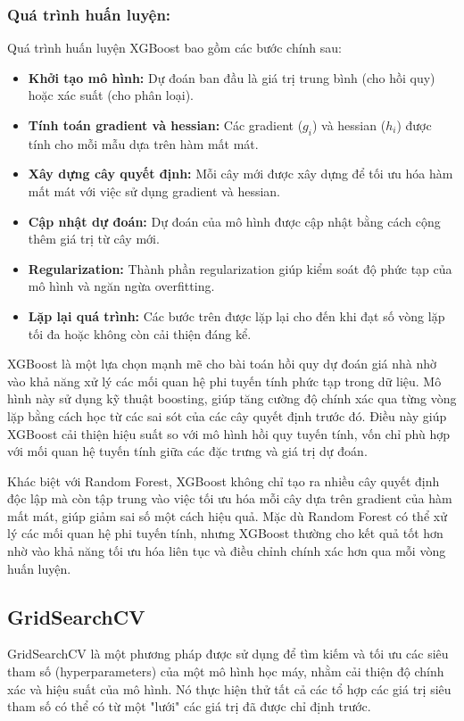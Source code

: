 \subsubsection*{Quá trình huấn luyện:}
Quá trình huấn luyện XGBoost bao gồm các bước chính sau:

\begin{itemize}
    \item[1. ] \textbf{Khởi tạo mô hình:} Dự đoán ban đầu là giá trị trung bình (cho hồi quy) hoặc xác suất (cho phân loại).
    \item[2.] \textbf{Tính toán gradient và hessian:} Các gradient (\( g_i \)) và hessian (\( h_i \)) được tính cho mỗi mẫu dựa trên hàm mất mát.
    \item[3.] \textbf{Xây dựng cây quyết định:} Mỗi cây mới được xây dựng để tối ưu hóa hàm mất mát với việc sử dụng gradient và hessian.
    \item[4.] \textbf{Cập nhật dự đoán:} Dự đoán của mô hình được cập nhật bằng cách cộng thêm giá trị từ cây mới.
    \item[5.] \textbf{Regularization:} Thành phần regularization giúp kiểm soát độ phức tạp của mô hình và ngăn ngừa overfitting.
    \item[6.] \textbf{Lặp lại quá trình:} Các bước trên được lặp lại cho đến khi đạt số vòng lặp tối đa hoặc không còn cải thiện đáng kể.
\end{itemize}

XGBoost là một lựa chọn mạnh mẽ cho bài toán hồi quy dự đoán giá nhà nhờ vào khả năng xử lý các mối quan hệ phi tuyến tính phức tạp trong dữ liệu. Mô hình này sử dụng kỹ thuật boosting, giúp tăng cường độ chính xác qua từng vòng lặp bằng cách học từ các sai sót của các cây quyết định trước đó. Điều này giúp XGBoost cải thiện hiệu suất so với mô hình hồi quy tuyến tính, vốn chỉ phù hợp với mối quan hệ tuyến tính giữa các đặc trưng và giá trị dự đoán.

Khác biệt với Random Forest, XGBoost không chỉ tạo ra nhiều cây quyết định độc lập mà còn tập trung vào việc tối ưu hóa mỗi cây dựa trên gradient của hàm mất mát, giúp giảm sai số một cách hiệu quả. Mặc dù Random Forest có thể xử lý các mối quan hệ phi tuyến tính, nhưng XGBoost thường cho kết quả tốt hơn nhờ vào khả năng tối ưu hóa liên tục và điều chỉnh chính xác hơn qua mỗi vòng huấn luyện.

\subsection{GridSearchCV} 
GridSearchCV là một phương pháp được sử dụng để tìm kiếm và tối ưu các siêu tham số (hyperparameters) của một mô hình học máy, nhằm cải thiện độ chính xác và hiệu suất của mô hình. Nó thực hiện thử tất cả các tổ hợp các giá trị siêu tham số có thể có từ một "lưới" các giá trị đã được chỉ định trước.

